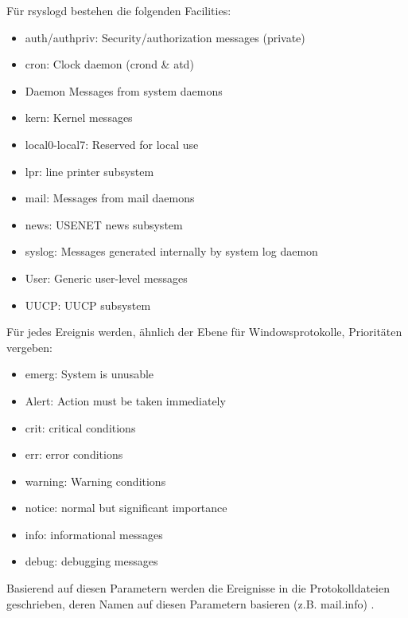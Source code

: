 Für rsyslogd bestehen die folgenden Facilities:
\begin{itemize}
\item auth/authpriv: Security/authorization messages (private)
\item cron: Clock daemon (crond \& atd)
\item Daemon Messages from system daemons
\item kern: Kernel messages
\item local0-local7: Reserved for local use
\item lpr: line printer subsystem
\item mail: Messages from mail daemons
\item news: USENET news subsystem
\item syslog: Messages generated internally by system log daemon
\item User: Generic user-level messages
\item UUCP: UUCP subsystem
\end{itemize}

Für jedes Ereignis werden, ähnlich der Ebene für Windowsprotokolle, Prioritäten vergeben:
\begin{itemize}
\item emerg: System is unusable
\item Alert: Action must be taken immediately
\item crit: critical conditions
\item err: error conditions
\item warning: Warning conditions
\item notice: normal but significant importance
\item info: informational messages
\item debug: debugging messages
\end{itemize}

Basierend auf diesen Parametern werden die Ereignisse in die Protokolldateien geschrieben, deren Namen auf diesen Parametern basieren (z.B. \glqq mail.info\grqq ) \citep{Linux2,Linux3}.


